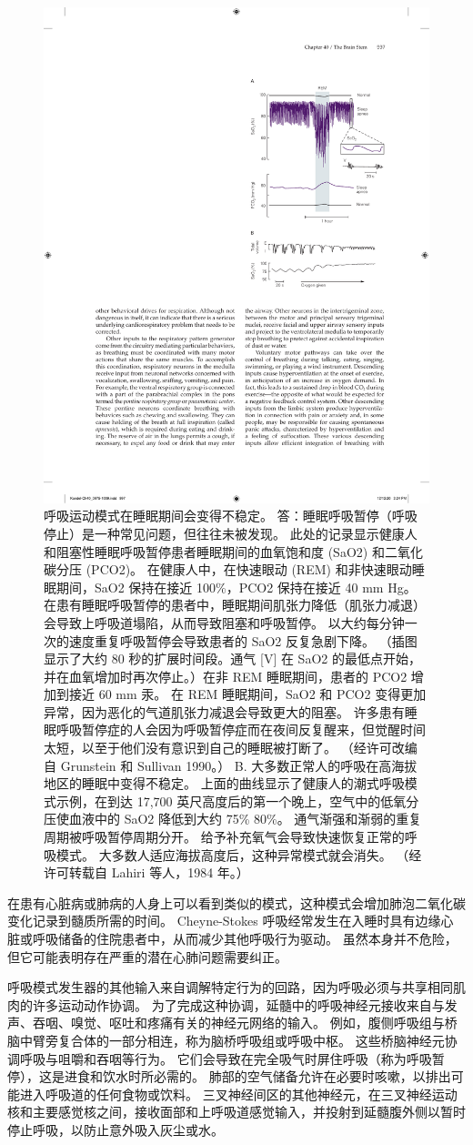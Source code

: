 \begin{figure}[htbp]
	\centering
	\includegraphics[width=0.5\linewidth]{chap40/fig_40_10}
	\caption{呼吸运动模式在睡眠期间会变得不稳定。 答：睡眠呼吸暂停（呼吸停止）是一种常见问题，但往往未被发现。 此处的记录显示健康人和阻塞性睡眠呼吸暂停患者睡眠期间的血氧饱和度 (SaO2) 和二氧化碳分压 (PCO2)。 在健康人中，在快速眼动 (REM) 和非快速眼动睡眠期间，SaO2 保持在接近 100\%，PCO2 保持在接近 40 mm Hg。 在患有睡眠呼吸暂停的患者中，睡眠期间肌张力降低（肌张力减退）会导致上呼吸道塌陷，从而导致阻塞和呼吸暂停。 以大约每分钟一次的速度重复呼吸暂停会导致患者的 SaO2 反复急剧下降。 （插图显示了大约 80 秒的扩展时间段。通气 [V] 在 SaO2 的最低点开始，并在血氧增加时再次停止。）在非 REM 睡眠期间，患者的 PCO2 增加到接近 60 mm 汞。 在 REM 睡眠期间，SaO2 和 PCO2 变得更加异常，因为恶化的气道肌张力减退会导致更大的阻塞。 许多患有睡眠呼吸暂停症的人会因为呼吸暂停症而在夜间反复醒来，但觉醒时间太短，以至于他们没有意识到自己的睡眠被打断了。 （经许可改编自 Grunstein 和 Sullivan 1990。） B. 大多数正常人的呼吸在高海拔地区的睡眠中变得不稳定。 上面的曲线显示了健康人的潮式呼吸模式示例，在到达 17,700 英尺高度后的第一个晚上，空气中的低氧分压使血液中的 SaO2 降低到大约 75\% 80\%。 通气渐强和渐弱的重复周期被呼吸暂停周期分开。 给予补充氧气会导致快速恢复正常的呼吸模式。 大多数人适应海拔高度后，这种异常模式就会消失。 （经许可转载自 Lahiri 等人，1984 年。）}
	\label{fig:40_10}
\end{figure}


在患有心脏病或肺病的人身上可以看到类似的模式，这种模式会增加肺泡二氧化碳变化记录到髓质所需的时间。
Cheyne-Stokes 呼吸经常发生在入睡时具有边缘心脏或呼吸储备的住院患者中，从而减少其他呼吸行为驱动。
虽然本身并不危险，但它可能表明存在严重的潜在心肺问题需要纠正。


呼吸模式发生器的其他输入来自调解特定行为的回路，因为呼吸必须与共享相同肌肉的许多运动动作协调。
为了完成这种协调，延髓中的呼吸神经元接收来自与发声、吞咽、嗅觉、呕吐和疼痛有关的神经元网络的输入。
例如，腹侧呼吸组与桥脑中臂旁复合体的一部分相连，称为脑桥呼吸组或呼吸中枢。
这些桥脑神经元协调呼吸与咀嚼和吞咽等行为。
它们会导致在完全吸气时屏住呼吸（称为呼吸暂停），这是进食和饮水时所必需的。
肺部的空气储备允许在必要时咳嗽，以排出可能进入呼吸道的任何食物或饮料。
三叉神经间区的其他神经元，在三叉神经运动核和主要感觉核之间，接收面部和上呼吸道感觉输入，并投射到延髓腹外侧以暂时停止呼吸，以防止意外吸入灰尘或水。


